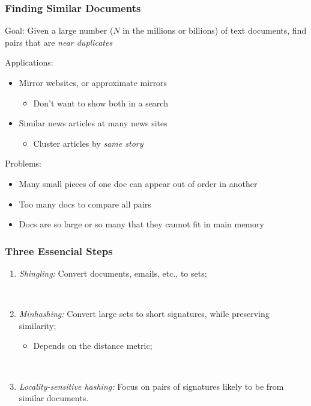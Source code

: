 \documentclass[svgnames]{beamer}
\begin{document}
\begin{frame} \frametitle{Finding Similar Documents}

\begin{block}{Goal:}
Given a large number ($N$ in the millions or billions) of text documents, find pairs that are \emph{near duplicates}
\end{block}

\begin{block}{Applications:}
  \small
  \begin{itemize}
  \item Mirror websites, or approximate mirrors
    \begin{itemize}
    \item Don’t want to show both in a search
    \end{itemize}
  \item Similar news articles at many news sites
    \begin{itemize}
    \item Cluster articles by \emph{same story}
    \end{itemize}
  \end{itemize}
\end{block}
\begin{block}{Problems:}
  \small
  \begin{itemize}
  \item Many small pieces of one doc can appear out of order in another
  \item Too many docs to compare all pairs
  \item Docs are so large or so many that they cannot fit in main memory
  \end{itemize}
\end{block}
\end{frame}

  
\begin{frame} \frametitle{Three Essencial Steps}

\begin{enumerate}
\item \emph{Shingling:} Convert documents, emails, etc., to sets;

~\\

\item \emph{Minhashing:} Convert large sets to short signatures, while preserving similarity;
   \begin{itemize}
   \item Depends on the distance metric;
   \end{itemize}

~\\

\item \emph{Locality-sensitive hashing:} Focus on pairs of signatures likely to be from similar documents.
\end{enumerate}

\end{frame}
\end{document}

